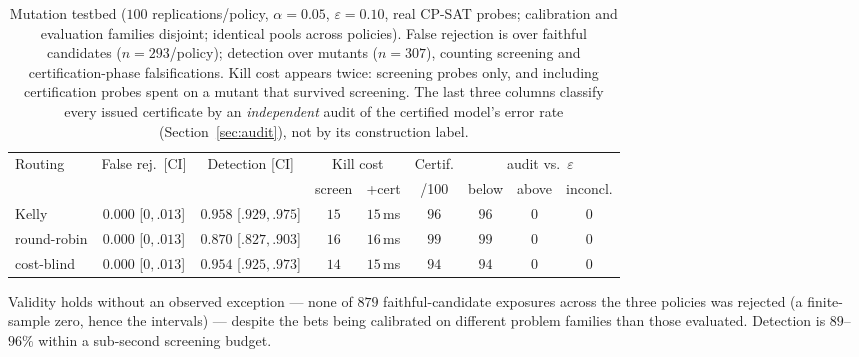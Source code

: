 \documentclass[pdflatex,sn-mathphys-num]{sn-jnl}
\theoremstyle{thmstyleone}
\theoremstyle{thmstyletwo}
\begin{document}
\begin{table}[t]
\caption{Mutation testbed ($100$ replications/policy, $\alpha=0.05$,
$\varepsilon = 0.10$, real CP-SAT probes; calibration and evaluation
families disjoint; identical pools across policies). False rejection
is over faithful candidates ($n = 293$/policy); detection over mutants
($n = 307$), counting screening and certification-phase
falsifications. Kill cost appears twice: screening probes only, and
including certification probes spent on a mutant that survived
screening. The last three columns classify every issued certificate by
an \emph{independent} audit of the certified model's error rate
(Section~\ref{sec:audit}), not by its construction label.}
\label{tab:testbed}
\begin{tabular}{lcccccccc}
\toprule
Routing & False rej.\ [CI] & Detection [CI] & \multicolumn{2}{c}{Kill cost}
& Certif. & \multicolumn{3}{c}{audit vs.\ $\varepsilon$}\\
 & & & screen & +cert & /100 & below & above & inconcl.\\
\midrule
Kelly       & $0.000$ [$0, .013$] & $0.958$ [$.929, .975$] & $15$ & $15$\,ms
& $96$ & $96$ & $0$ & $0$\\
round-robin & $0.000$ [$0, .013$] & $0.870$ [$.827, .903$] & $16$ & $16$\,ms
& $99$ & $99$ & $0$ & $0$\\
cost-blind  & $0.000$ [$0, .013$] & $0.954$ [$.925, .973$] & $14$ & $15$\,ms
& $94$ & $94$ & $0$ & $0$\\
\bottomrule
\end{tabular}
\end{table}

Validity holds without an observed exception --- none of $879$
faithful-candidate exposures across the three policies was rejected
(a finite-sample zero, hence the intervals) --- despite the bets being
calibrated on different problem families than those evaluated.
Detection is $89$--$96\%$ within a sub-second screening budget.
\end{document}
